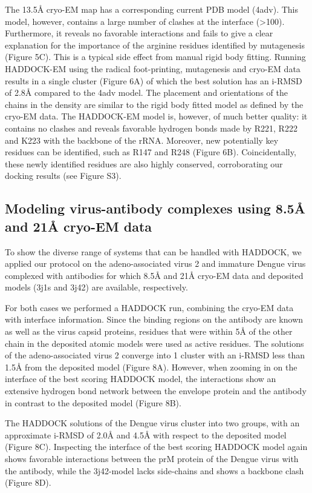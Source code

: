 The 13.5Å cryo-EM map has a corresponding current PDB model (4adv). This model, however, contains a large number of clashes at the interface (>100). Furthermore, it reveals no favorable interactions and fails to give a clear explanation for the importance of the arginine residues identified by mutagenesis (Figure 5C). This is a typical side effect from manual rigid body fitting. Running HADDOCK-EM using the radical foot-printing, mutagenesis and cryo-EM data results in a single cluster (Figure 6A) of which the best solution has an i-RMSD of 2.8Å compared to the 4adv model. The placement and orientations of the chains in the density are similar to the rigid body fitted model as defined by the cryo-EM data. The HADDOCK-EM model is, however, of much better quality: it contains no clashes and reveals favorable hydrogen bonds made by R221, R222 and K223 with the backbone of the rRNA. Moreover, new potentially key residues can be identified, such as R147 and R248 (Figure 6B). Coincidentally, these newly identified residues are also highly conserved, corroborating our docking results (see Figure S3).

\subsection{Modeling virus-antibody complexes using 8.5Å and 21Å cryo-EM data}

To show the diverse range of systems that can be handled with HADDOCK, we applied our protocol on the adeno-associated virus 2 and immature Dengue virus complexed with antibodies for which 8.5Å and 21Å cryo-EM data and deposited models (3j1s and 3j42) are available, respectively.

For both cases we performed a HADDOCK run, combining the cryo-EM data with interface information. Since the binding regions on the antibody are known as well as the virus capsid proteins, residues that were within 5Å of the other chain in the deposited atomic models were used as active residues. The solutions of the adeno-associated virus 2 converge into 1 cluster with an i-RMSD less than 1.5Å from the deposited model (Figure 8A). However, when zooming in on the interface of the best scoring HADDOCK model, the interactions show an extensive hydrogen bond network between the envelope protein and the antibody in contrast to the deposited model (Figure 8B). 

The HADDOCK solutions of the Dengue virus cluster into two groups, with an approximate i-RMSD of 2.0Å and 4.5Å with respect to the deposited model (Figure 8C). Inspecting the interface of the best scoring HADDOCK model again shows favorable interactions between the prM protein of the Dengue virus with the antibody, while the 3j42-model lacks side-chains and shows a backbone clash (Figure 8D). 

